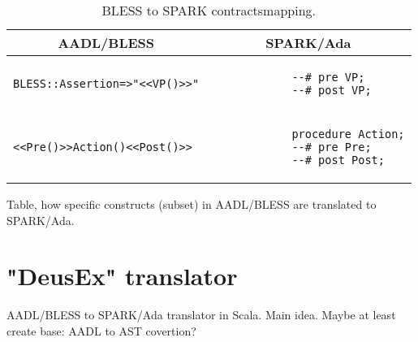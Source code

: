 \begin{table}[!ht]
	\caption{BLESS to SPARK contractsmapping.}
	\centering
  	\begin{tabular}{ | p{3in} | p{3in} |}

		\hline
		\multicolumn{1}{|c|}{\textbf{AADL/BLESS}} & \multicolumn{1}{|c|}{\textbf{SPARK/Ada}} \\ \hline

		\begin{lstlisting}[language=bless]
			BLESS::Assertion=>"<<VP()>>"
		\end{lstlisting} 
		& 
		\begin{lstlisting}
			--# pre VP;
			--# post VP; 
		\end{lstlisting} 

		\\ \hline

		\begin{lstlisting}[language=aadl]
			<<Pre()>>Action()<<Post()>>
		\end{lstlisting} 
		& 
		\begin{lstlisting}
			procedure Action;
			--# pre Pre;
			--# post Post;
		\end{lstlisting} 

		\\ \hline
	\end{tabular}
\end{table}

Table, how specific constructs (subset) in AADL/BLESS are translated to SPARK/Ada.

\section{"DeusEx" translator}
\label{codegen:translator}
AADL/BLESS to SPARK/Ada translator in Scala. Main idea.
Maybe at least create base: AADL to AST covertion?

